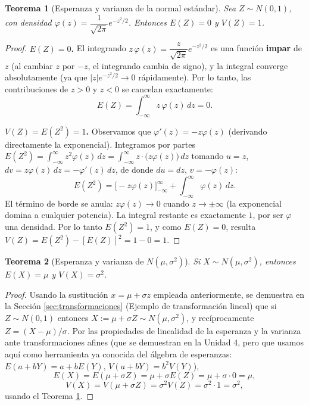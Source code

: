 \documentclass[11pt,a4paper]{article}
\theoremstyle{plain}
\newtheorem{teorema}{Teorema}[section]
\theoremstyle{definition}
\theoremstyle{remark}
\begin{document}
\begin{center}
\end{center}

\begin{teorema}[Esperanza y varianza de la normal estándar]\label{thm:momentos_estandar}
Sea $Z\sim N(0,1)$, con densidad $\varphi(z)=\dfrac{1}{\sqrt{2\pi}}e^{-z^2/2}$. Entonces $E(Z)=0$ y $V(Z)=1$.
\end{teorema}
\begin{proof}
\textbf{$E(Z)=0$.} El integrando $z\,\varphi(z)=\dfrac{z}{\sqrt{2\pi}}e^{-z^2/2}$ es una función \textbf{impar} de $z$ (al cambiar $z$ por $-z$, el integrando cambia de signo), y la integral converge absolutamente (ya que $|z|e^{-z^2/2}\to0$ rápidamente). Por lo tanto, las contribuciones de $z>0$ y $z<0$ se cancelan exactamente:
$$E(Z)=\int_{-\infty}^{\infty}z\,\varphi(z)\,dz=0.$$

\textbf{$V(Z)=E(Z^2)=1$.} Observamos que $\varphi'(z)=-z\varphi(z)$ (derivando directamente la exponencial). Integramos por partes $E(Z^2)=\int_{-\infty}^\infty z^2\varphi(z)\,dz=\int_{-\infty}^\infty z\cdot\big(z\varphi(z)\big)\,dz$ tomando $u=z$, $dv=z\varphi(z)\,dz=-\varphi'(z)\,dz$, de donde $du=dz$, $v=-\varphi(z)$:
$$E(Z^2)=\big[-z\varphi(z)\big]_{-\infty}^{\infty}+\int_{-\infty}^{\infty}\varphi(z)\,dz.$$
El término de borde se anula: $z\varphi(z)\to0$ cuando $z\to\pm\infty$ (la exponencial domina a cualquier potencia). La integral restante es exactamente $1$, por ser $\varphi$ una densidad. Por lo tanto $E(Z^2)=1$, y como $E(Z)=0$, resulta $V(Z)=E(Z^2)-[E(Z)]^2=1-0=1$.
\end{proof}

\begin{teorema}[Esperanza y varianza de $N(\mu,\sigma^2)$]
Si $X\sim N(\mu,\sigma^2)$, entonces $E(X)=\mu$ y $V(X)=\sigma^2$.
\end{teorema}
\begin{proof}
Usando la sustitución $x=\mu+\sigma z$ empleada anteriormente, se demuestra en la Sección \ref{sec:transformaciones} (Ejemplo de transformación lineal) que si $Z\sim N(0,1)$ entonces $X:=\mu+\sigma Z\sim N(\mu,\sigma^2)$, y recíprocamente $Z=(X-\mu)/\sigma$. Por las propiedades de linealidad de la esperanza y la varianza ante transformaciones afines (que se demuestran en la Unidad 4, pero que usamos aquí como herramienta ya conocida del álgebra de esperanzas: $E(a+bY)=a+bE(Y)$, $V(a+bY)=b^2V(Y)$),
$$E(X)=E(\mu+\sigma Z)=\mu+\sigma E(Z)=\mu+\sigma\cdot0=\mu,$$
$$V(X)=V(\mu+\sigma Z)=\sigma^2V(Z)=\sigma^2\cdot1=\sigma^2,$$
usando el Teorema \ref{thm:momentos_estandar}.
\end{proof}
\end{document}
